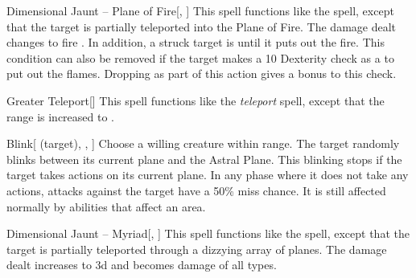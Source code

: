 \lowercase{\hypertarget{spell:Dimensional Jaunt -- Plane of Fire}{}}\label{spell:Dimensional Jaunt -- Plane of Fire}
\begin{freeability}[\nth{3}]{\hypertarget{spell:Dimensional Jaunt -- Plane of Fire}{Dimensional Jaunt -- Plane of Fire}}[, ]
This spell functions like the  spell, except that the target is partially teleported into the Plane of Fire.
The damage dealt changes to fire .
In addition, a struck target is  until it puts out the fire.
This condition can also be removed if the target makes a  10 Dexterity check as a  to put out the flames.
Dropping  as part of this action gives a  bonus to this check.
\end{freeability}
\vspace{0.25em}



\lowercase{\hypertarget{spell:Greater Teleport}{}}\label{spell:Greater Teleport}
\begin{freeability}[\nth{3}]{\hypertarget{spell:Greater Teleport}{Greater Teleport}}[]
This spell functions like the \textit{teleport} spell, except that the range is increased to \rngext.
\end{freeability}
\vspace{0.25em}



\lowercase{\hypertarget{spell:Blink}{}}\label{spell:Blink}
\begin{attuneability}[\nth{4}]{\hypertarget{spell:Blink}{Blink}}[ (target), , ]
Choose a willing creature within \rngclose range.
The target randomly blinks between its current plane and the Astral Plane.
This blinking stops if the target takes actions on its current plane.
In any phase where it does not take any actions,  attacks against the target have a 50\% miss chance.
It is still affected normally by abilities that affect an area.
\end{attuneability}
\vspace{0.25em}



\lowercase{\hypertarget{spell:Dimensional Jaunt -- Myriad}{}}\label{spell:Dimensional Jaunt -- Myriad}
\begin{freeability}[\nth{4}]{\hypertarget{spell:Dimensional Jaunt -- Myriad}{Dimensional Jaunt -- Myriad}}[, ]
This spell functions like the  spell, except that the target is partially teleported through a dizzying array of planes.
The damage dealt increases to  \plus3d and becomes damage of all types.
\end{freeability}
\vspace{0.25em}



